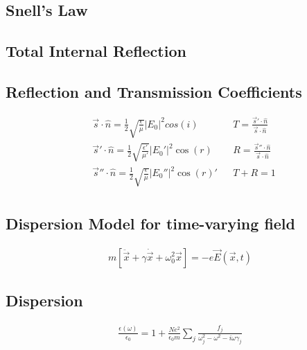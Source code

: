 \documentclass[a4paper, 11pt, landscape]{article}
\begin{document}
\begin{multicols*}{3}
\begin{compactenum}
\end{compactenum}

\subsection{Snell's Law}
\begin{compactenum}

\end{compactenum}

\subsection{Total Internal Reflection}
\begin{compactenum}

\end{compactenum}

\subsection{Reflection and Transmission Coefficients}
\begin{compactenum}
	\begin{align*}
        &\vec{s} \cdot \hat{n} = \frac{1}{2}\sqrt{\frac{\epsilon}{\mu}}|E_{0}|^{2}cos(i) &
        &T = \frac{\vec{s}' \cdot \hat{n}}{\vec{s} \cdot \hat{n}} \\
        &\vec{s}' \cdot \hat{n} = \frac{1}{2}\sqrt{\frac{\epsilon'}{\mu'}}|E_{0}'|^{2}\cos(r) &
        &R = \frac{\vec{s}'' \cdot \hat{n}}{\vec{s} \cdot \hat{n}} \\
        &\vec{s}'' \cdot \hat{n} = \frac{1}{2}\sqrt{\frac{\epsilon}{\mu}}|E_{0}''|^{2}\cos(r)' &
        &T + R = 1 \\
	\end{align*}
\end{compactenum}

\subsection{Dispersion Model for time-varying field}
\begin{compactenum}
	\begin{align*}
        m[\ddot{\vec{x}} + \gamma\dot{\vec{x}} + \omega_{0}^{2}\vec{x}] = -e\vec{E}(\vec{x}, t)
	\end{align*}
\end{compactenum}

\subsection{Dispersion}
\begin{compactenum}
	\begin{align*}
        \frac{\epsilon(\omega)}{\epsilon_{0}} = 1 + \frac{Ne^{2}}{\epsilon_{0}m}\sum_{j}\frac{f_{j}}{\omega^{2}_{j} - \omega^{2} - i\omega\gamma_{j}}
	\end{align*}
\end{compactenum}


\end{multicols*}
\end{document}
